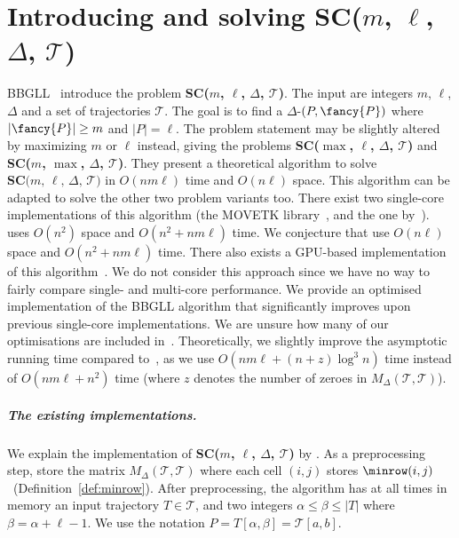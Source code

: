 \section{\texorpdfstring{Introducing and solving SC($m$, $\ell$, $\Delta$, $\mathcal{T}$)}{Introducing and solving SC(m, l, D, T)} }
\label{sec:BBGLL}
%
BBGLL~\cite{buchin2011detecting} introduce the problem \textbf{SC($m$, $\ell$, $\Delta$, $\mathcal{T}$)}.
The input are integers $m$, $\ell$, $\Delta$ and a set of trajectories $\mathcal{T}$.  The goal is to find a $\Delta$-\pathlet $(P, {\fancy{P}})$ where $|{\fancy{P}}| \geq m$ and $|P| = \ell$.  
The problem statement may be slightly altered by maximizing $m$ or $\ell$ instead, giving the problems \textbf{SC($\max$, $\ell$, $\Delta$, $\mathcal{T}$)} and \textbf{SC($m$, $\max$, $\Delta$, $\mathcal{T}$)}.
They present a theoretical algorithm to solve $\textbf{SC($m$, $\ell$, $\Delta$, $\mathcal{T}$)}$ in $O(n m \ell)$ time and $O(n \ell)$ space.
This algorithm can be adapted to solve the other two problem variants too. 
%
%
There exist two single-core implementations of this algorithm (the MOVETK library~\cite{movetk}, and the one by~\cite{buchin2017clustering, buchin2020improved}). 
\cite{movetk} uses $O(n^2)$ space and $O(n^2 + n m \ell)$ time.
We conjecture that \cite{buchin2017clustering, buchin2020improved} use $O(n \ell)$ space and $O(n^2 + n m \ell)$ time.
There also exists a GPU-based implementation of this algorithm~\cite{gudmundsson2012gpu}. We do not consider this approach since we have no way to fairly compare single- and multi-core performance.
We provide an optimised implementation of the BBGLL algorithm that significantly improves upon previous single-core implementations. We are unsure how many of our optimisations are included in~\cite{buchin2017clustering, buchin2020improved}. Theoretically, we slightly improve the asymptotic running time compared to~\cite{buchin2011detecting}, as we use $O( n m \ell + (n + z) \log^3 n)$ time instead of $O(n m \ell + n^2)$ time (where $z$ denotes the number of zeroes in $M_\Delta(\mathcal{T}, \mathcal{T})$). 
%
%
%
\subparagraph{The existing implementations.}
We explain the implementation of \textbf{SC($m$, $\ell$, $\Delta$, $\mathcal{T}$)} by \cite{movetk}. 
As a preprocessing step, store the matrix $M_\Delta(\mathcal{T}, \mathcal{T})$ where each cell $(i, j)$ stores $\minrow(i, j)$ ~(Definition~\ref{def:minrow}).
After preprocessing, the algorithm has at all times in memory an input trajectory $T \in \mathcal{T}$, and two integers $\alpha \leq \beta \leq |T|$ where $\beta = \alpha  + \ell - 1$. We use the notation $P = T[\alpha, \beta] = \mathcal{T}[a, b]$. 
